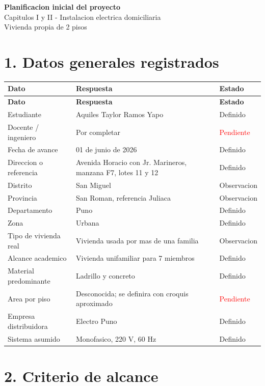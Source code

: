 \documentclass[12pt,a4paper]{article}
\newcommand{\pendiente}{\textcolor{red}{Pendiente}}
\newcommand{\obs}{\textcolor{orange!70!black}{Observacion}}
\newcommand{\ok}{\textcolor{green!50!black}{Definido}}
\begin{document}
\begin{center}
{\Large \textbf{Planificacion inicial del proyecto}}\\
{\large Capitulos I y II - Instalacion electrica domiciliaria}\\
{\normalsize Vivienda propia de 2 pisos}
\end{center}

\section*{1. Datos generales registrados}

\begin{longtable}{L{5.2cm}L{7.8cm}L{2.2cm}}
\toprule
\textbf{Dato} & \textbf{Respuesta} & \textbf{Estado} \\
\midrule
\endfirsthead
\toprule
\textbf{Dato} & \textbf{Respuesta} & \textbf{Estado} \\
\midrule
\endhead
Estudiante & Aquiles Taylor Ramos Yapo & \ok \\
Docente / ingeniero & Por completar & \pendiente \\
Fecha de avance & 01 de junio de 2026 & \ok \\
Direccion o referencia & Avenida Horacio con Jr. Marineros, manzana F7, lotes 11 y 12 & \ok \\
Distrito & San Miguel & \obs \\
Provincia & San Roman, referencia Juliaca & \obs \\
Departamento & Puno & \ok \\
Zona & Urbana & \ok \\
Tipo de vivienda real & Vivienda usada por mas de una familia & \obs \\
Alcance academico & Vivienda unifamiliar para 7 miembros & \ok \\
Material predominante & Ladrillo y concreto & \ok \\
Area por piso & Desconocida; se definira con croquis aproximado & \pendiente \\
Empresa distribuidora & Electro Puno & \ok \\
Sistema asumido & Monofasico, 220 V, 60 Hz & \ok \\
\bottomrule
\end{longtable}

\section*{2. Criterio de alcance}
\end{document}
